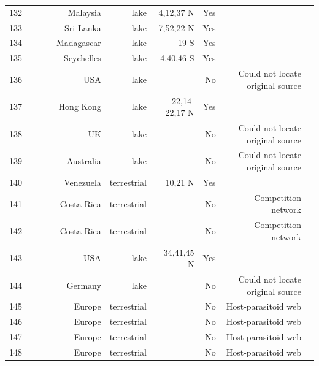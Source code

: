 \documentclass[12pt]{article}
\begin{document}
\begin{landscape}
\begin{table}[h!]
\begin{tabular}{rrrrrrrrr}
      132   & ~\citet{GlobalWeb} & ~\citet{Beaver1985} & Malaysia & lake  & 4,12,37 N & Yes   &       &  \\
      133   & ~\citet{GlobalWeb} & ~\citet{Beaver1985} & Sri Lanka & lake  & 7,52,22 N & Yes   &       &  \\
      134   & ~\citet{GlobalWeb} & ~\citet{Beaver1985} & Madagascar & lake  & 19 S  & Yes   &       &  \\
      135   & ~\citet{GlobalWeb} & ~\citet{Beaver1985} & Seychelles & lake  & 4,40,46 S & Yes   &       &  \\
      136   & ~\citet{GlobalWeb} & ~\citet{Bradshaw1983} & USA   & lake  &       & No    & Could not locate original source &  \\
      137   & ~\citet{GlobalWeb} & ~\citet{Corker1984} & Hong Kong & lake  & 22,14-22,17 N & Yes   &       &  \\
      138   & ~\citet{GlobalWeb} & ~\citet{Kitching1983} & UK    & lake  &       & No    & Could not locate original source &  \\
      139   & ~\citet{GlobalWeb} & ~\citet{Kitching1983} & Australia & lake  &       & No    & Could not locate original source &  \\
      140   & ~\citet{GlobalWeb} & ~\citet{Siefert1979} & Venezuela & terrestrial & 10,21 N & Yes   &       &  \\
      141   & ~\citet{GlobalWeb} & ~\citet{Seifert1976} & Costa Rica & terrestrial &       & No    & Competition network &  \\
      142   & ~\citet{GlobalWeb} & ~\citet{Seifert1976} & Costa Rica & terrestrial &       & No    & Competition network &  \\
      143   & ~\citet{GlobalWeb} & ~\citet{Snow1958} & USA   & lake  & 34,41,45 N & Yes   &       &  \\
      144   & ~\citet{GlobalWeb} & ~\citet{Snow1958} & Germany & lake  &       & No    & Could not locate original source &  \\
      145   & ~\citet{GlobalWeb} & ~\citet{Rejmanek1979} & Europe & terrestrial &       & No    & Host-parasitoid web &  \\
      146   & ~\citet{GlobalWeb} & ~\citet{Rejmanek1979} & Europe & terrestrial &       & No    & Host-parasitoid web &  \\
      147   & ~\citet{GlobalWeb} & ~\citet{Rejmanek1979} & Europe & terrestrial &       & No    & Host-parasitoid web &  \\
      148   & ~\citet{GlobalWeb} & ~\citet{Rejmanek1979} & Europe & terrestrial &       & No    & Host-parasitoid web &  \\

\end{tabular}
\end{table}
\end{landscape}
\end{document}
